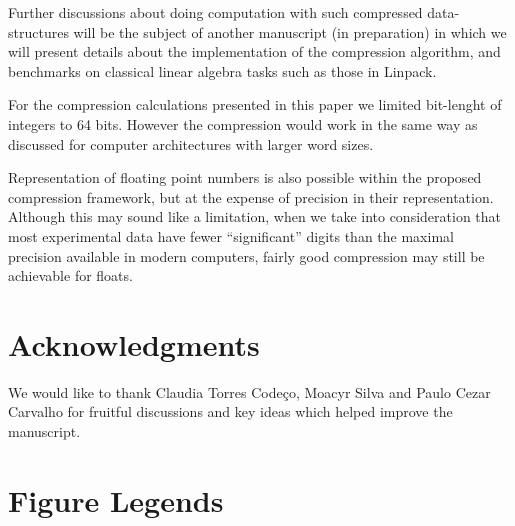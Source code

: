 \documentclass[10pt]{article}
\begin{document}
Further discussions about doing computation with such compressed data-structures
will be the subject of another manuscript (in preparation) in which we will
present details about the implementation of the compression algorithm, and
benchmarks on classical linear algebra tasks such as those in
Linpack\cite{dongarra1979linpack}.

For the compression calculations presented in this paper we limited bit-lenght of integers to 64 bits. However the 
compression would work in the same way as discussed for computer architectures with larger word sizes. 

Representation of floating point numbers is also possible within the proposed compression framework, but at the expense 
of precision in their representation. Although this may sound like a limitation, when we take into consideration that 
most experimental data have fewer ``significant'' digits than the maximal precision available in modern computers, 
fairly good compression may still be achievable for floats. 



\section*{Acknowledgments}
We would like to thank Claudia Torres Code\c{c}o, Moacyr Silva and Paulo
Cezar Carvalho for fruitful discussions and key ideas which helped improve the
manuscript.



\section*{Figure Legends}
\end{document}
